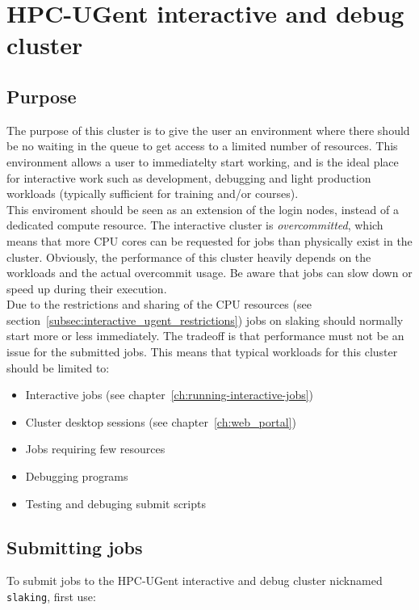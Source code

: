 \chapter{HPC-UGent interactive and debug cluster}
\label{ch:interactive_ugent}


\section{Purpose}
\label{sec:interactive_ugent_pupose}
The purpose of this cluster is to give the user an environment where
there should be no waiting in the queue to get access to a limited
number of resources. This environment allows a user to immediatelty
start working, and is the ideal place for interactive work such as
development, debugging and light production workloads (typically sufficient
for training and/or courses). \\ This enviroment should be seen as an
extension of the login nodes, instead of a dedicated compute resource.
The interactive cluster is \emph{overcommitted}, which means that more CPU cores can be
requested for jobs than physically exist in the cluster. Obviously, the performance of this cluster
heavily depends on the workloads and the actual overcommit usage. Be aware that jobs can slow
down or speed up during their execution.
 \\
Due to the restrictions and sharing of the CPU resources (see section~\ref{subsec:interactive_ugent_restrictions}) 
jobs on slaking should normally start more or less immediately.
The tradeoff is that performance must not be an issue for the submitted jobs.
This means that typical workloads for this cluster should be limited to:
\begin{itemize}
  \item  Interactive jobs (see chapter~\ref{ch:running-interactive-jobs})
  \item  Cluster desktop sessions (see chapter~\ref{ch:web_portal})
  \item  Jobs requiring few resources
  \item  Debugging programs
  \item  Testing and debuging submit scripts
\end{itemize} 

\section{Submitting jobs}
\label{sec:interactive_ugent_jobs}

To submit jobs to the HPC-UGent interactive and debug cluster nicknamed \lstinline|slaking|, first use:

